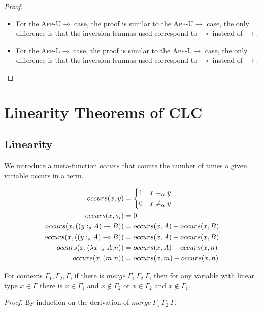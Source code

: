 \documentclass[sigplan,screen,review,anonymous]{acmart}
\newcommand{\rname}[1]{\textsc{\footnotesize #1}}
\newcommand{\stype}[1]{:_#1}
\newcommand{\mrg}[3]{merge\ {#1}\ {#2}\ {#3}}
\begin{document}
\begin{proof}
\begin{itemize}
    \item For the \rname{App-U$\multimap$} case, the proof is similar to the \rname{App-U$\rightarrow$} case, the only difference is that the inversion lemmas used correspond to $\multimap$ instead of $\rightarrow$.
    \item For the \rname{App-L$\multimap$} case, the proof is similar to the \rname{App-L$\rightarrow$} case, the only difference is that the inversion lemmas used correspond to $\multimap$ instead of $\rightarrow$.
  \end{itemize}
\end{proof}

\section{Linearity Theorems of CLC}

\subsection{Linearity}

We introduce a meta-function $occurs$ that counts the number of times a given variable occurs in a term.

\begin{align*}
  occurs(x, y)                               & =
  \begin{dcases}
    1 & x =_\alpha y    \\
    0 & x \neq_\alpha y
  \end{dcases}                                                \\
  occurs(x, s_i)                             & = 0                           \\
  occurs(x, ((y \stype{s} A) \rightarrow B)) & = occurs(x, A) + occurs(x, B) \\
  occurs(x, ((y \stype{s} A) \multimap B))   & = occurs(x, A) + occurs(x, B) \\
  occurs(x, (\lambda x \stype{s} A.n))       & = occurs(x, A) + occurs(x, n) \\
  occurs(x, (m\ n))                          & = occurs(x, m) + occurs(x, n)
\end{align*}

\begin{lemma}\label{islmergeinv}
  For contexts $\Gamma_1, \Gamma_2, \Gamma$, if there is $\mrg{\Gamma_1}{\Gamma_2}{\Gamma}$, then for any variable with linear type $x \in \Gamma$ there is $x \in \Gamma_1$ and $x \notin \Gamma_2$ or $x \in \Gamma_2$ and $x \notin \Gamma_1$.
\end{lemma}
\begin{proof}
  By induction on the derivation of $\mrg{\Gamma_1}{\Gamma_2}{\Gamma}$.
\end{proof}
\end{document}
